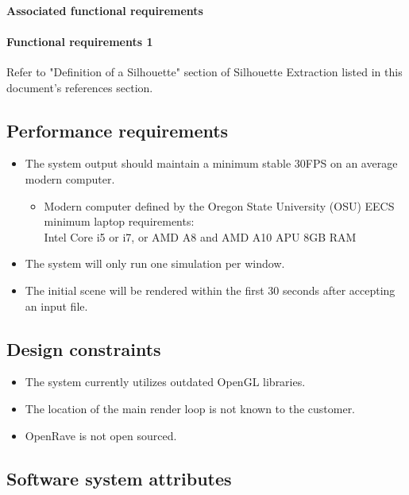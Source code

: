 \documentclass[10pt,journal,compsoc]{IEEEtran}
\begin{document}
\begin{flushleft}
\paragraph{Associated functional requirements}

\paragraph{Functional requirements 1}
Refer to "Definition of a Silhouette" section of Silhouette Extraction listed in this document's references section.

\subsection{Performance requirements}
\vspace{3mm}
\begin{itemize}
\item The system output should maintain a minimum stable 30FPS on an average modern computer.
\begin{itemize}
\item Modern computer defined by the Oregon State University (OSU) EECS minimum laptop requirements: \\
Intel Core i5 or i7, or AMD A8 and AMD A10 APU
8GB RAM

\end{itemize}
\item The system will only run one simulation per window.
\item The initial scene will be rendered within the first 30 seconds after accepting an input file.
\end{itemize}

\subsection{Design constraints}
\vspace{3mm}
\begin{itemize}
\item The system currently utilizes outdated OpenGL libraries.
\item The location of the main render loop is not known to the customer.
\item OpenRave is not open sourced.
\end{itemize}


\subsection{Software system attributes}
\vspace{3mm}

\end{flushleft}
\end{document}
